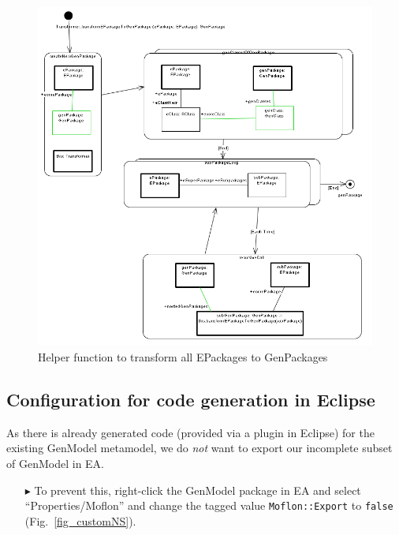 \begin{figure}[htbp]
\begin{center}  
\includegraphics[width=1.0\textwidth]{pics/Ecore2GenModel_Bilder/EA_transPack2gM.png}
\caption{Helper function to transform all \textsf{EPackages} to \textsf{GenPackages}}  
\label{fig_transf}
\end{center}
\end{figure} 


\subsection{Configuration for code generation in Eclipse}
\label{sec:Project Combination}

As there is already generated code (provided via a plugin in Eclipse) for the existing \textsf{GenModel} metamodel, we do \emph{not} want to export our incomplete subset of \textsf{GenModel} in EA. 
\begin{enumerate}
\item[$\blacktriangleright$] To prevent this, right-click the \textsf{GenModel} package in EA and select ``Properties/Moflon'' and change the tagged value \texttt{Moflon::Export} to \texttt{false} (Fig.~\ref{fig_customNS}).
\end{enumerate}

